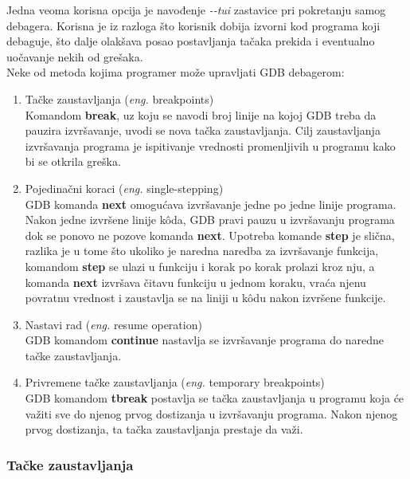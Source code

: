 \documentclass[a4paper]{article}
\begin{document}
Jedna veoma korisna opcija je navođenje \textit{-\phantom{}-tui} zastavice pri pokretanju samog debagera. 
Korisna je iz razloga što korisnik dobija izvorni kod programa koji debaguje, što dalje olakšava posao postavljanja
tačaka prekida i eventualno uočavanje nekih od grešaka\cite{oReilly}.\\
Neke od metoda kojima programer može upravljati GDB debagerom\cite{art_debugging}:
\begin{enumerate}
\item Tačke zaustavljanja (\textit{eng.} breakpoints) \\
Komandom \textbf{break}, uz koju se navodi broj linije na kojoj GDB treba da pauzira izvršavanje, 
uvodi se nova tačka zaustavljanja. Cilj zaustavljanja izvršavanja programa je ispitivanje vrednosti
promenljivih u programu kako bi se otkrila greška.
\item Pojedinačni koraci (\textit{eng.} single-stepping)\\
GDB komanda \textbf{next} omogućava izvršavanje jedne po jedne linije programa. 
Nakon jedne izvršene linije k\^{o}da, GDB pravi pauzu u izvršavanju programa dok se ponovo ne 
pozove komanda \textbf{next}. Upotreba komande \textbf{step} je slična, razlika je u tome što
ukoliko je naredna naredba za izvršavanje funkcija, 
komandom \textbf{step} se ulazi u funkciju i korak po korak prolazi kroz nju, a 
komanda \textbf{next} izvršava čitavu funkciju u jednom koraku, vraća njenu povratnu 
vrednost i zaustavlja se na liniji u k\^{o}du nakon izvršene funkcije.
\item Nastavi rad (\textit{eng.} resume operation)\\
GDB komandom \textbf{continue} nastavlja se izvršavanje programa do naredne tačke zaustavljanja. 
\item Privremene tačke zaustavljanja (\textit{eng.} temporary breakpoints)\\
GDB komandom \textbf{tbreak} postavlja se tačka zaustavljanja u programu koja će važiti 
sve do njenog prvog dostizanja u izvršavanju programa. Nakon njenog prvog dostizanja, 
ta tačka zaustavljanja prestaje da važi. 
\end{enumerate}

\subsubsection{Tačke zaustavljanja}
\label{subsec:gdbtackezaustavljanja}
\end{document}
